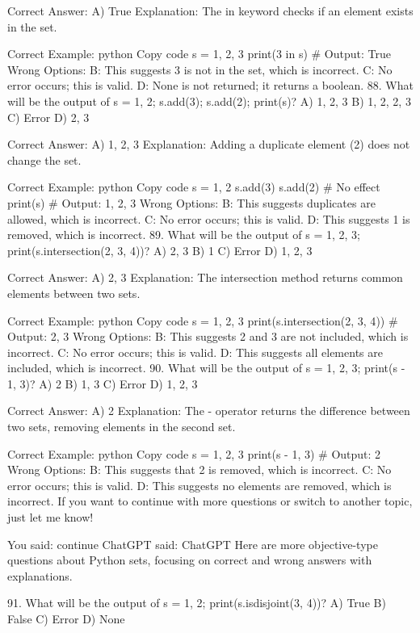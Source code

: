 Correct Answer: A) True
Explanation: The in keyword checks if an element exists in the set.

Correct Example:
python
Copy code
s = {1, 2, 3}
print(3 in s)  # Output: True
Wrong Options:
B: This suggests 3 is not in the set, which is incorrect.
C: No error occurs; this is valid.
D: None is not returned; it returns a boolean.
88. What will be the output of s = {1, 2}; s.add(3); s.add(2); print(s)?
A) {1, 2, 3}
B) {1, 2, 2, 3}
C) Error
D) {2, 3}

Correct Answer: A) {1, 2, 3}
Explanation: Adding a duplicate element (2) does not change the set.

Correct Example:
python
Copy code
s = {1, 2}
s.add(3)
s.add(2)  # No effect
print(s)  # Output: {1, 2, 3}
Wrong Options:
B: This suggests duplicates are allowed, which is incorrect.
C: No error occurs; this is valid.
D: This suggests 1 is removed, which is incorrect.
89. What will be the output of s = {1, 2, 3}; print(s.intersection({2, 3, 4}))?
A) {2, 3}
B) {1}
C) Error
D) {1, 2, 3}

Correct Answer: A) {2, 3}
Explanation: The intersection method returns common elements between two sets.

Correct Example:
python
Copy code
s = {1, 2, 3}
print(s.intersection({2, 3, 4}))  # Output: {2, 3}
Wrong Options:
B: This suggests 2 and 3 are not included, which is incorrect.
C: No error occurs; this is valid.
D: This suggests all elements are included, which is incorrect.
90. What will be the output of s = {1, 2, 3}; print(s - {1, 3})?
A) {2}
B) {1, 3}
C) Error
D) {1, 2, 3}

Correct Answer: A) {2}
Explanation: The - operator returns the difference between two sets, removing elements in the second set.

Correct Example:
python
Copy code
s = {1, 2, 3}
print(s - {1, 3})  # Output: {2}
Wrong Options:
B: This suggests that 2 is removed, which is incorrect.
C: No error occurs; this is valid.
D: This suggests no elements are removed, which is incorrect.
If you want to continue with more questions or switch to another topic, just let me know!






You said:
continue
ChatGPT said:
ChatGPT
Here are more objective-type questions about Python sets, focusing on correct and wrong answers with explanations.

91. What will be the output of s = {1, 2}; print(s.isdisjoint({3, 4}))?
A) True
B) False
C) Error
D) None


